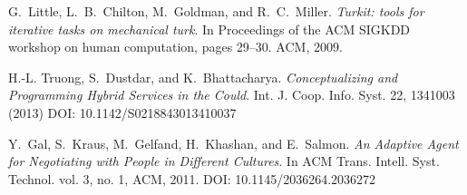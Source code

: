 \documentclass{llncs}
\begin{document}
\begin{thebibliography}{1}
G.~Little, L.~B.~Chilton, M.~Goldman, and R.~C.~Miller. \emph{Turkit: tools for iterative tasks on mechanical turk}. In Proceedings of the ACM SIGKDD workshop on human computation, pages 29–30. ACM, 2009.

 H.-L. Truong, S.~Dustdar, and K.~Bhattacharya. \emph{Conceptualizing and Programming Hybrid Services in the Could}. Int. J. Coop. Info. Syst. 22, 1341003 (2013) DOI: 10.1142/S0218843013410037

Y.~Gal, S.~Kraus, M.~Gelfand, H.~Khashan, and E.~Salmon. \emph{An Adaptive Agent for Negotiating with People in Different Cultures}. In  ACM Trans. Intell. Syst. Technol. vol. 3, no. 1, ACM, 2011. DOI: 10.1145/2036264.2036272

\end{thebibliography}
\end{document}
